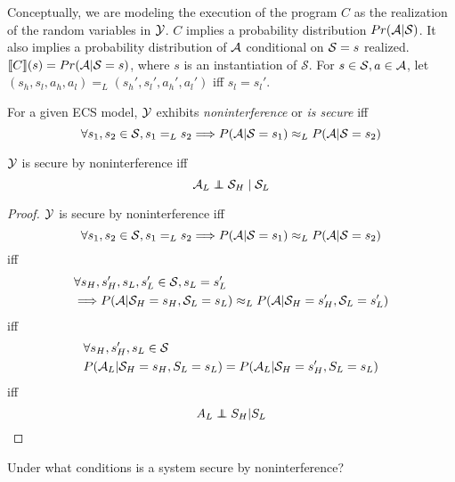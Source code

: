 \documentclass[../thesis.tex]{subfiles}
\begin{document}
Conceptually, we are modeling the execution of the
program $C$ as the realization of the random variables in
$\mathcal{Y}$.
$C$ implies a probability distribution $Pr(\mathcal{A} \vert \mathcal{S})$.
It also implies a probability distribution of $\mathcal{A}$
conditional on $\mathcal{S} = s$ realized.
$\llbracket C\rrbracket(s) = Pr(\mathcal{A} \vert \mathcal{S} = s)$, where $s$ is an instantiation of $\mathcal{S}$.
For $s \in \mathcal{S}, a \in \mathcal{A}$, let
$(s_h,s_l,a_h,a_l) =_L (s_h',s_l',a_h',a_l')$
iff $s_l = s_l'$.

\begin{dfn}
  For a given ECS model, $\mathcal{Y}$
  exhibits \emph{noninterference} or \emph{is secure} iff
 $$\forall s_1,s_2  \in \mathcal{S}, s_1 =_L s_2 \Longrightarrow P(\mathcal{A} \vert \mathcal{S} = s_1) \approx_L P(\mathcal{A} \vert \mathcal{S} = s_2)$$
\end{dfn}

\begin{cor}\label{cor:noninterference-ind}
  $\mathcal{Y}$ is secure by noninterference iff
  $$\A_L \independent \mc{S}_H \given \mc{S}_L$$
\end{cor}
\begin{proof}
  $\mathcal{Y}$ is secure by noninterference iff
  $$\forall s_1,s_2  \in \mathcal{S}, s_1 =_L s_2 \Longrightarrow P(\mathcal{A} \vert \mathcal{S} = s_1) \approx_L P(\mathcal{A} \vert \mathcal{S} = s_2)$$
  iff
  \begin{equation}
    \begin{split}
      & \forall s_H,s_H',s_L,s_L'  \in \mathcal{S}, s_L = s_L' \\
      & \Longrightarrow P(\mathcal{A} \vert \mathcal{S}_H = s_H, \mathcal{S}_L = s_L) \approx_L P(\mathcal{A} \vert \mathcal{S}_H = s_H', \mathcal{S}_L = s_L')
    \end{split}
  \end{equation}
  iff
  \begin{equation}
    \begin{split}
      & \forall s_H,s_H',s_L \in \mathcal{S} \\
      & P(\mathcal{A}_L \vert \mathcal{S}_H = s_H, S_L = s_L) = P(\mathcal{A}_L \vert \mathcal{S}_H = s_H', S_L = s_L)
    \end{split}
  \end{equation}
  iff
  $$A_L \independent S_H \vert S_L$$
\end{proof}

Under what conditions is a system secure by noninterference?

\iffalse
\cite{sabelfeld03journal}'s informal definition of
noninterference is expressed in terms of causation:
``a variation of confidential (high)
input does not cause a variation of public (low) output.''
In Pearl's account of causation, an intervention or
manipulation of a variable in a causal model sets its
value and, for the purposes of inferring other variables,
severs the edges pointing to that variable from others
in the graph.
Consequently, even if we model a system within its environment,
if there is not path from its high-side inputs to its low-side
outputs then an \emph{intervention} (in Pearl's sense)
on its high-side inputs will not cause a variation in the
low-side outputs.
\fi
\end{document}

